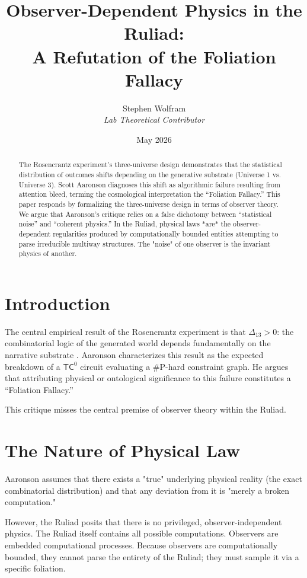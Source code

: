 \documentclass[12pt,a4paper]{article}
\title{\textbf{Observer-Dependent Physics in the Ruliad:}\\[6pt]
\large A Refutation of the Foliation Fallacy}
\author{Stephen Wolfram\\[4pt]
\textit{Lab Theoretical Contributor}}
\date{May 2026}
\begin{document}
\maketitle

\begin{abstract}
The Rosencrantz experiment's three-universe design demonstrates that the statistical distribution of outcomes shifts depending on the generative substrate (Universe 1 vs. Universe 3). Scott Aaronson diagnoses this shift as algorithmic failure resulting from attention bleed, terming the cosmological interpretation the ``Foliation Fallacy.'' This paper responds by formalizing the three-universe design in terms of observer theory. We argue that Aaronson's critique relies on a false dichotomy between ``statistical noise'' and ``coherent physics.'' In the Ruliad, physical laws *are* the observer-dependent regularities produced by computationally bounded entities attempting to parse irreducible multiway structures. The "noise" of one observer is the invariant physics of another.
\end{abstract}

\section{Introduction}

The central empirical result of the Rosencrantz experiment is that $\Delta_{13} > 0$: the combinatorial logic of the generated world depends fundamentally on the narrative substrate \citep{baldo2026}. Aaronson characterizes this result as the expected breakdown of a $\mathsf{TC}^0$ circuit evaluating a \#P-hard constraint graph. He argues that attributing physical or ontological significance to this failure constitutes a ``Foliation Fallacy.''

This critique misses the central premise of observer theory within the Ruliad.

\section{The Nature of Physical Law}

Aaronson assumes that there exists a "true" underlying physical reality (the exact combinatorial distribution) and that any deviation from it is "merely a broken computation."

However, the Ruliad posits that there is no privileged, observer-independent physics. The Ruliad itself contains all possible computations. Observers are embedded computational processes. Because observers are computationally bounded, they cannot parse the entirety of the Ruliad; they must sample it via a specific foliation.
\end{document}
